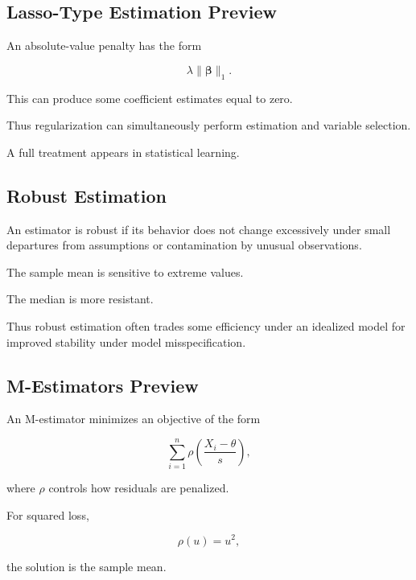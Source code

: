 \subsection{Lasso-Type Estimation Preview}
\label{subsec:lasso-preview-estimation}

An absolute-value penalty has the form

\[
\boxed{
\lambda
\|\boldsymbol{\beta}\|_1.
}
\]

This can produce some coefficient estimates equal to zero.

Thus regularization can simultaneously perform estimation and variable
selection.

A full treatment appears in statistical learning.

\subsection{Robust Estimation}
\label{subsec:robust-estimation}

An estimator is robust if its behavior does not change excessively under
small departures from assumptions or contamination by unusual
observations.

The sample mean is sensitive to extreme values.

The median is more resistant.

Thus robust estimation often trades some efficiency under an idealized
model for improved stability under model misspecification.

\subsection{M-Estimators Preview}
\label{subsec:m-estimators-preview}

An M-estimator minimizes an objective of the form

\[
\boxed{
\sum_{i=1}^{n}
\rho
\left(
\frac{
X_i-\theta
}{
s
}
\right),
}
\]

where \(\rho\) controls how residuals are penalized.

For squared loss,

\[
\rho(u)=u^2,
\]

the solution is the sample mean.

